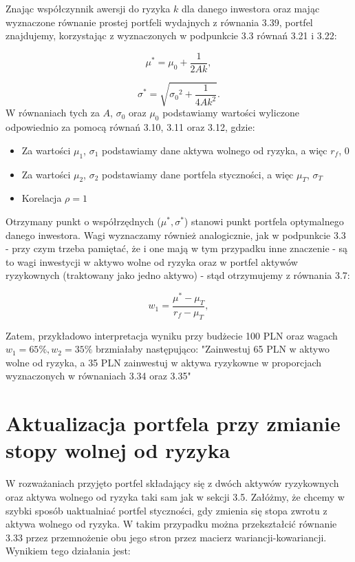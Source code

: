 \documentclass[magister]{dyplom}
\begin{document}
Znając współczynnik awersji do ryzyka $k$ dla danego inwestora oraz mając wyznaczone równanie prostej portfeli wydajnych z równania 3.39, portfel znajdujemy, korzystając z wyznaczonych w podpunkcie 3.3 równań 3.21 i 3.22:

\begin{equation}
	\mu^* = \mu_0 + \frac{1}{2Ak},
\end{equation}

\begin{equation}
	\sigma^* = \sqrt{{\sigma_0}^2+\frac{1}{4Ak^2}}.
\end{equation}
W równaniach tych za $A$, $\sigma_0$ oraz $\mu_0$ podstawiamy wartości wyliczone odpowiednio za pomocą równań 3.10, 3.11 oraz 3.12, gdzie:
\begin{itemize}
	\item Za wartości $\mu_1$, $\sigma_1$ podstawiamy dane aktywa wolnego od ryzyka, a więc $r_f$, $0$
	\item Za wartości $\mu_2$, $\sigma_2$ podstawiamy dane portfela styczności, a więc $\mu_T$, $\sigma_T$
	\item Korelacja $\rho = 1$
\end{itemize} 
Otrzymany punkt o współrzędnych ($\mu^*, \sigma^*$) stanowi punkt portfela optymalnego danego inwestora. Wagi wyznaczamy również analogicznie, jak w podpunkcie 3.3 - przy czym trzeba pamiętać, że i one mają w tym przypadku inne znaczenie - są to wagi inwestycji w aktywo wolne od ryzyka oraz w portfel aktywów ryzykownych (traktowany jako jedno aktywo) - stąd otrzymujemy z równania 3.7:

\begin{equation}
w_1 = \frac{\mu^* - \mu_T}{r_f - \mu_T},
\end{equation}

Zatem, przykładowo interpretacja wyniku przy budżecie 100 PLN oraz wagach $w_1 = 65\%, w_2 = 35\%$ brzmiałaby następująco: "Zainwestuj 65 PLN w aktywo wolne od ryzyka, a 35 PLN zainwestuj w aktywa ryzykowne w proporcjach wyznaczonych w równaniach 3.34 oraz 3.35"

\section{Aktualizacja portfela przy zmianie stopy wolnej od ryzyka}
W rozważaniach przyjęto portfel składający się z dwóch aktywów ryzykownych oraz aktywa wolnego od ryzyka taki sam jak w sekcji 3.5. Załóżmy, że chcemy w szybki sposób uaktualniać portfel styczności, gdy zmienia się stopa zwrotu z aktywa wolnego od ryzyka.
W takim przypadku można przekształcić równanie 3.33 przez przemnożenie obu jego stron przez macierz wariancji-kowariancji. Wynikiem tego działania jest:
\end{document}
